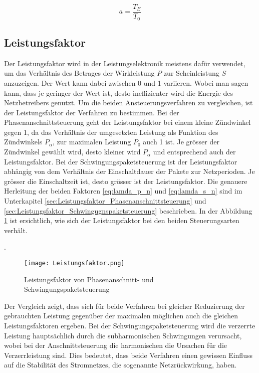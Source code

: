 \begin{equation}\label{eq:Einschaltverhältnis}
a = \frac{T_E}{T_0}
\end{equation}




\subsection{Leistungsfaktor}
Der Leistungsfaktor wird in der Leistungselektronik meistens dafür verwendet, um das Verhältnis des Betrages der Wirkleistung $P$ zur Scheinleistung $S$ anzuzeigen. Der Wert kann dabei zwischen 0 und 1 variieren. Wobei man sagen kann, dass je geringer der Wert ist, desto ineffizienter wird die Energie des Netzbetreibers genutzt. Um die beiden Ansteuerungsverfahren zu vergleichen, ist der Leistungsfaktor der Verfahren zu bestimmen. Bei der Phasenanschnittsteuerung geht der Leistungsfaktor bei einem kleine Zündwinkel gegen 1, da das Verhältnis der umgesetzten Leistung als Funktion des Zündwinkels $P_{\alpha}$, zur maximalen Leistung $P_0$ auch 1 ist. Je grösser der Zündwinkel gewählt wird, desto kleiner wird $P_{\alpha}$ und entsprechend auch der Leistungsfaktor. Bei der Schwingungspaketsteuerung ist der Leistungsfaktor abhängig von dem Verhältnis der Einschaltdauer der Pakete zur Netzperioden. Je grösser die Einschaltzeit ist, desto grösser ist der Leistungsfaktor. Die genauere Herleitung der beiden Faktoren \ref{eq:lamda_p_n} und \ref{eq:lamda_s_n} sind im Unterkapitel \ref{sec:Leistungsfaktor_Phasenanschnittsteuerung} und \ref{sec:Leistungsfaktor_Schwingugnspaketsteuerung} beschrieben. In der  Abbildung \ref{fig:Leistungsfaktor} ist ersichtlich, wie sich der Leistungsfaktor bei den beiden Steuerungsarten verhält.

\cite{Leistungselektronik}.
\begin{figure}[ht!]
	\centering
	\texttt{[image: Leistungsfaktor.png]}	
	\caption{Leistungsfaktor von Phasenanschnitt- und Schwingungspaketsteuerung}\label{fig:Leistungsfaktor}
\end{figure}


Der Vergleich zeigt, dass sich für beide Verfahren bei gleicher Reduzierung der gebrauchten Leistung gegenüber der maximalen möglichen auch die gleichen Leistungsfaktoren ergeben. Bei der Schwingungspaketsteuerung wird die verzerrte Leistung hauptsächlich durch die subharmonischen Schwingungen verursacht, wobei bei der Anschnittsteuerung die harmonischen die Ursachen für die Verzerrleistung sind. Dies bedeutet, dass beide Verfahren einen gewissen Einfluss auf die Stabilität des Stromnetzes, die sogenannte Netzrückwirkung, haben.
\newpage
